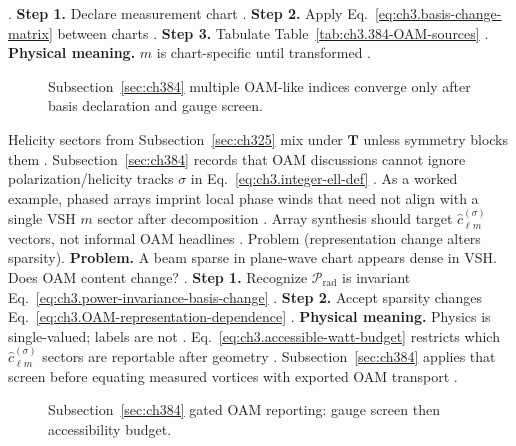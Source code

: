 \cite{allen1992}.
\textbf{Step 1.} Declare measurement chart \cite{stratton1941}.
\textbf{Step 2.} Apply Eq.~\eqref{eq:ch3.basis-change-matrix} between charts \cite{hansen1988}.
\textbf{Step 3.} Tabulate Table~\ref{tab:ch3.384-OAM-sources} \cite{harrington2001}.
\textbf{Physical meaning.} \(m\) is chart-specific until transformed \cite{jackson1999}.
\begin{figure}[t]
\centering
{}
\caption{Subsection~\ref{sec:ch384} multiple OAM-like indices converge only after basis declaration and gauge screen.}
\label{fig:ch3.384-multi-index-gate}
\end{figure}
Helicity sectors from Subsection~\ref{sec:ch325} mix under \(\mathbf{T}\) unless symmetry blocks them \cite{belinfante1940}.
Subsection~\ref{sec:ch384} records that OAM discussions cannot ignore polarization/helicity tracks \(\sigma\) in
Eq.~\eqref{eq:ch3.integer-ell-def} \cite{harrington2001}.
As a worked example, phased arrays imprint local phase winds that need not align with a single VSH \(m\) sector after decomposition
\cite{allen1992}. Array synthesis should target \(\widehat{c}_{\ell m}^{(\sigma)}\) vectors, not informal OAM
headlines \cite{hansen1988}.
Problem (representation change alters sparsity). \textbf{Problem.} A beam sparse in plane-wave chart appears dense in VSH. Does OAM content change?
\cite{harrington2001}.
\textbf{Step 1.} Recognize \(\mathcal{P}_{\mathrm{rad}}\) is invariant Eq.~\eqref{eq:ch3.power-invariance-basis-change} \cite{poynting1884}.
\textbf{Step 2.} Accept sparsity changes Eq.~\eqref{eq:ch3.OAM-representation-dependence} \cite{hansen1988}.
\textbf{Physical meaning.} Physics is single-valued; labels are not \cite{stratton1941}.
Eq.~\eqref{eq:ch3.accessible-watt-budget} restricts which \(\widehat{c}_{\ell m}^{(\sigma)}\) sectors are reportable after geometry
\cite{harrington2001}. Subsection~\ref{sec:ch384} applies that screen before equating measured vortices with exported OAM
transport \cite{hansen1988}.
\begin{figure}[t]
\centering
{}
\caption{Subsection~\ref{sec:ch384} gated OAM reporting: gauge screen then accessibility budget.}
\label{fig:ch3.384-gated-OAM-report}
\end{figure}
